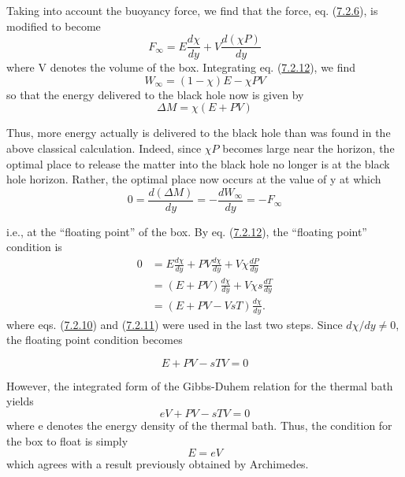 \documentclass[11pt,a4paper]{article}
\begin{document}
Taking into account the buoyancy force, we find that the force, eq. (\hyperref[eq:7.2.6]{7.2.6}), is modified to become
\begin{equation*}
F_\infty=E\frac{d\chi}{dy}+V\frac{d(\chi P)}{dy} \tag{7.2.12}\label{eq:7.2.12}
\end{equation*}
where V denotes the volume of the box. Integrating eq. (\hyperref[eq:7.2.12]{7.2.12}), we find
\begin{equation*}
W_{\infty} = (1 - \chi) E - \chi PV \tag{7.2.13}\label{eq:7.2.13}
\end{equation*}
so that the energy delivered to the black hole now is given by
\begin{equation*}
\Delta M = \chi (E + PV) \tag{7.2.14}\label{eq:7.2.14}
\end{equation*}

Thus, more energy actually is delivered to the black hole than was found in the above classical calculation. Indeed, since \(\chi P\) becomes large near the horizon, the optimal place to release the matter into the black hole no longer is at the black hole horizon. Rather, the optimal place now occurs at the value of y at which
\begin{equation*}
0 = \frac{d(\Delta M)}{dy} = -\frac{dW_{\infty}}{dy} = -F_{\infty} \tag{7.2.15}\label{eq:7.2.15}
\end{equation*}

i.e., at the ``floating point'' of the box. By eq. (\hyperref[eq:7.2.12]{7.2.12}), the ``floating point'' condition is
\begin{equation*}
\begin{aligned}
0&=E\frac{d\chi}{dy}+PV\frac{d\chi}{dy}+V\chi\frac{dP}{dy}\\
 &=(E+PV)\frac{d\chi}{dy}+V\chi s\frac{dT}{dy}\\
 &=(E+PV-VsT)\frac{d\chi}{dy}.
\end{aligned} \tag{7.2.16}\label{eq:7.2.16}
\end{equation*}
where eqs. (\hyperref[eq:7.2.10]{7.2.10}) and (\hyperref[eq:7.2.11]{7.2.11}) were used in the last two steps. Since \(d\chi/dy \neq 0\), the floating point condition becomes

\hypertarget{source-183}{}
\begin{equation*}
E + PV - sTV = 0 \tag{7.2.17}\label{eq:7.2.17}
\end{equation*}

However, the integrated form of the Gibbs-Duhem relation for the thermal bath yields
\begin{equation*}
eV + PV - sTV = 0 \tag{7.2.18}\label{eq:7.2.18}
\end{equation*}
where e denotes the energy density of the thermal bath. Thus, the condition for the box to float is simply
\begin{equation*}
E = eV \tag{7.2.19}\label{eq:7.2.19}
\end{equation*}
which agrees with a result previously obtained by Archimedes.
\end{document}
